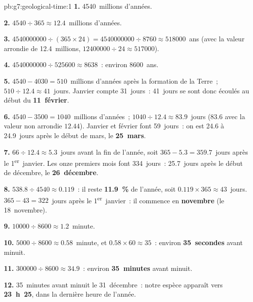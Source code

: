 \begin{solution}{pb:g7:geological-time:1}
\textbf{1.} \num{4540}~millions d'années.

\textbf{2.} $4540 \div 365 \approx 12.4$~millions d'années.

\textbf{3.} $\num{4540000000} \div (365 \times 24) = \num{4540000000}
\div 8760 \approx \num{518000}$~ans (avec la valeur arrondie de
\num{12.4}~millions, $\num{12400000} \div 24 \approx \num{517000}$).

\textbf{4.} $\num{4540000000} \div \num{525600} \approx 8638$~: environ
\num{8600}~ans.

\textbf{5.} $4540 - 4030 = 510$~millions d'années après la formation de la
Terre~; $510 \div 12.4 \approx 41$~jours. Janvier compte 31~jours~: 41~jours
se sont donc écoulés au début du \textbf{11~février}.

\textbf{6.} $4540 - 3500 = 1040$~millions d'années~; $1040 \div 12.4 \approx
83.9$~jours (83.6 avec la valeur non arrondie $12.44$).
Janvier et février font 59~jours~: on est 24.6 à 24.9~jours après le
début de mars, le \textbf{25~mars}.

\textbf{7.} $66 \div 12.4 \approx 5.3$~jours avant la fin de l'année,
soit $365 - 5.3 = 359.7$~jours après le 1\textsuperscript{er}~janvier. Les
onze premiers mois font 334~jours~: 25.7~jours après le début de décembre,
le \textbf{26~décembre}.

\textbf{8.} $538.8 \div 4540 \approx 0.119$~: il reste \textbf{11.9~\%} de
l'année, soit $0.119 \times 365 \approx 43$~jours. $365 - 43 =
322$~jours après le 1\textsuperscript{er}~janvier~: il commence en
\textbf{novembre} (le 18~novembre).

\textbf{9.} $\num{10000} \div 8600 \approx 1.2$~minute.

\textbf{10.} $5000 \div 8600 \approx 0.58$~minute, et $0.58 \times 60
\approx 35$~: environ \textbf{35~secondes} avant minuit.

\textbf{11.} $\num{300000} \div 8600 \approx 34.9$~: environ \textbf{35~minutes}
avant minuit.

\textbf{12.} 35~minutes avant minuit le 31~décembre~: notre espèce
apparaît vers \textbf{23~h~25}, dans la dernière heure de l'année.
\end{solution}
